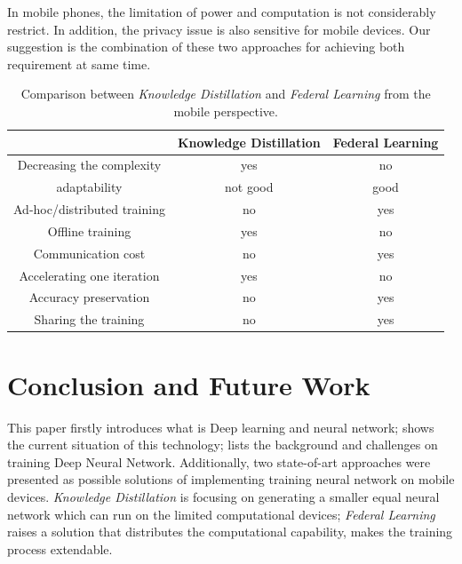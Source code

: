 \documentclass[article]{aaltoseries}
\begin{document}
In mobile phones, the limitation of power and computation is not considerably restrict. 
In addition, the privacy issue is also sensitive for mobile devices. Our suggestion is the combination
of these two approaches for achieving both requirement at same time.



\begin{table}
  
\begin{center}
  \begin{tabular}{ |c|c|c| } 
   \hline
                                               & Knowledge Distillation & Federal Learning \\ 
   \hline
   Decreasing the complexity                   & yes                    & no \\ 
   \hline
   adaptability                                & not good               & good \\ 
   \hline
   Ad-hoc/distributed training                 & no                     & yes \\ 
   \hline
   Offline training                            & yes                    & no \\ 
   \hline
   Communication cost                          & no                     & yes \\ 
   \hline
   Accelerating one iteration                  & yes                    & no \\ 
   \hline
   Accuracy preservation                       & no                     & yes \\ 
   \hline
   Sharing the training                        & no                     & yes \\ 
   \hline
  \end{tabular}
\end{center}

  \caption{Comparison between \emph{Knowledge Distillation} and \emph{Federal Learning} from the mobile perspective.}
\label{table:comparing}
\end{table}




\section{Conclusion and Future Work}
\label{sec:conclusion}

This paper firstly introduces what is Deep learning and neural network; shows the current situation of this technology;
lists the background and challenges on training Deep Neural Network. Additionally, two state-of-art approaches were 
presented as possible solutions of implementing training neural network on mobile devices. \emph{Knowledge Distillation} 
is focusing on generating a smaller equal neural network which can run on the limited computational devices; 
\emph{Federal Learning} raises a solution that distributes the computational capability, makes the training process
extendable. 
\end{document}
